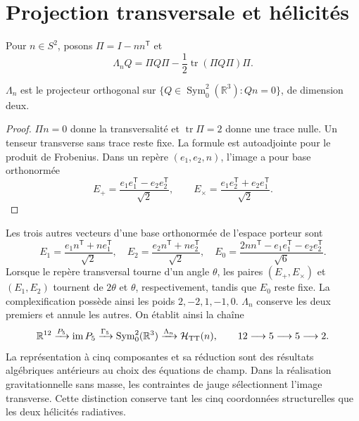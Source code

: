 \section{Projection transversale et hélicités}
Pour \(n\in S^2\), posons \(\Pi=I-nn^{\mathsf T}\) et
\[
 \Lambda_nQ=\Pi Q\Pi-\frac12\operatorname{tr}(\Pi Q\Pi)\Pi.
\]
\begin{proposition}
\(\Lambda_n\) est le projecteur orthogonal sur \(\{Q\in\operatorname{Sym}^2_0(\mathbb R^3):Qn=0\}\), de dimension deux.
\end{proposition}
\begin{proof}
\(\Pi n=0\) donne la transversalité et \(\operatorname{tr}\Pi=2\) donne
une trace nulle. Un tenseur transverse sans trace reste fixe.
La formule est autoadjointe pour le produit de Frobenius.
Dans un repère \((e_1,e_2,n)\), l'image a pour base orthonormée
\[
 E_+=\frac{e_1e_1^{\mathsf T}-e_2e_2^{\mathsf T}}{\sqrt2},\qquad
 E_\times=\frac{e_1e_2^{\mathsf T}+e_2e_1^{\mathsf T}}{\sqrt2}.
\]
\end{proof}
Les trois autres vecteurs d'une base orthonormée de l'espace porteur sont
\[
 E_1=\frac{e_1n^{\mathsf T}+ne_1^{\mathsf T}}{\sqrt2},\quad
 E_2=\frac{e_2n^{\mathsf T}+ne_2^{\mathsf T}}{\sqrt2},\quad
 E_0=\frac{2nn^{\mathsf T}-e_1e_1^{\mathsf T}-e_2e_2^{\mathsf T}}{\sqrt6}.
\]
Lorsque le repère transversal tourne d'un angle \(\theta\), les paires \((E_+,E_\times)\) et \((E_1,E_2)\) tournent de \(2\theta\) et \(\theta\), respectivement, tandis que \(E_0\) reste fixe. La complexification possède ainsi les poids \(2,-2,1,-1,0\). \(\Lambda_n\) conserve les deux premiers et annule les autres. On établit ainsi la chaîne
\[
 \mathbb R^{12}\xrightarrow{P_5}\operatorname{im}P_5
 \xrightarrow{\Gamma_5}\operatorname{Sym}^2_0(\mathbb R^3)
 \xrightarrow{\Lambda_n}\mathcal H_{\rm TT}(n),
 \qquad 12\longrightarrow5\longrightarrow5\longrightarrow2.
\]
La représentation à cinq composantes et sa réduction sont des résultats
algébriques antérieurs au choix des équations de champ.
Dans la réalisation gravitationnelle sans masse, les contraintes de jauge
sélectionnent l'image transverse. Cette distinction conserve tant les
cinq coordonnées structurelles que les deux hélicités radiatives.





